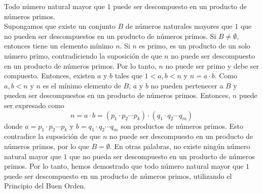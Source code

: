 \begin{example}
    Todo número natural mayor que $1$ puede ser descompuesto en un producto de números primos. \\
    \demostracion Supongamos que existe un conjunto $B$ de números naturales mayores que $1$ que no pueden ser descompuestos en un producto de números primos. Si $B \neq \emptyset$, entonces tiene un elemento mínimo $n$. Si $n$ es primo, es un producto de un solo número primo, contradiciendo la suposición de que $n$ no puede ser descompuesto en un producto de números primos. Por lo tanto, $n$ no puede ser primo y debe ser compuesto. Entonces, existen $a$ y $b$ tales que $1 < a, b < n$ y $n = a \cdot b$. Como $a, b < n$ y $n$ es el mínimo elemento de $B$, $a$ y $b$ no pueden pertenecer a $B$ y pueden ser descompuestos en un producto de números primos. Entonces, $n$ puede ser expresado como
    $$n = a \cdot b = (p_1 \cdot p_2 \cdots p_k) \cdot (q_1 \cdot q_2 \cdots q_m)$$
    donde $a = p_1 \cdot p_2 \cdots p_k$ y $b = q_1 \cdot q_2 \cdots q_m$ son productos de números primos. Esto contradice la suposición de que $n$ no puede ser descompuesto en un producto de números primos, por lo que $B = \emptyset$. En otras palabras, no existe ningún número natural mayor que $1$ que no pueda ser descompuesto en un producto de números primos. Por lo tanto, hemos demostrado que todo número natural mayor que $1$ puede ser descompuesto en un producto de números primos, utilizando el Principio del Buen Orden.
\end{example}

